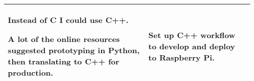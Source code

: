 \begin{table}[!h]
\begin{tabularx}{\textwidth}{|X|X|X|}
\begin{myitemize}
            \item Instead of C I could use C++.
            \item A lot of the online resources suggested prototyping in Python, then translating to C++ for production.
        \end{myitemize} & 
        \begin{myitemize}
            \item Set up C++ workflow to develop and deploy to Raspberry Pi.
        \end{myitemize} \\
        \hline
    \end{tabularx}
\end{table}
